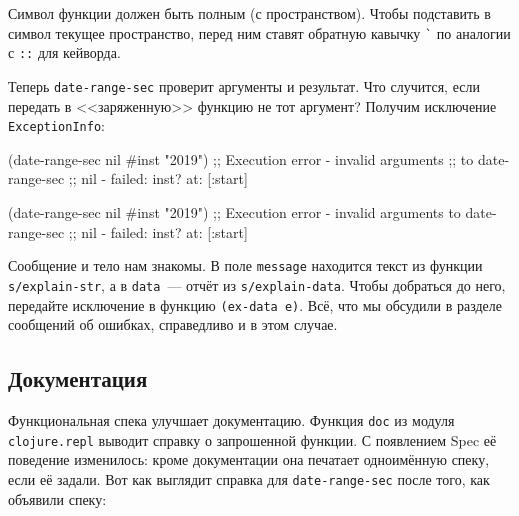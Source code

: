 \fi


Символ функции должен быть полным (с пространством). Чтобы подставить в символ
текущее пространство, перед ним ставят обратную кавычку \verb|`| по аналогии с
\verb|::| для кейворда.

Теперь \verb|date-range-sec| проверит аргументы и результат. Что случится,
если передать в <<заряженную>> функцию не тот аргумент? Получим исключение
\verb|ExceptionInfo|:

\ifx\DEVICETYPE\MOBILE

\begin{english}
  \begin{clojure}
(date-range-sec nil #inst "2019")
;; Execution error - invalid arguments
;; to date-range-sec
;; nil - failed: inst? at: [:start]
  \end{clojure}
\end{english}

\else

\begin{english}
  \begin{clojure}
(date-range-sec nil #inst "2019")
;; Execution error - invalid arguments to date-range-sec
;; nil - failed: inst? at: [:start]
  \end{clojure}
\end{english}

\fi


Сообщение и тело нам знакомы. В поле \verb|message| находится текст из функции
\verb|s/explain-str|, а в \verb|data|~--- отчёт из \verb|s/explain-data|. Чтобы
добраться до него, передайте исключение в функцию \verb|(ex-data e)|. Всё, что
мы обсудили в разделе сообщений об ошибках, справедливо и в этом случае.

\subsection{Документация}


Функциональная спека улучшает документацию. Функция \verb|doc| из модуля
\verb|clojure.repl| выводит справку о запрошенной функции. С появлением Spec её
поведение изменилось: кроме документации она печатает одноимённую спеку, если её
задали. Вот как выглядит справка для \verb|date-range-sec| после того, как
объявили спеку:

